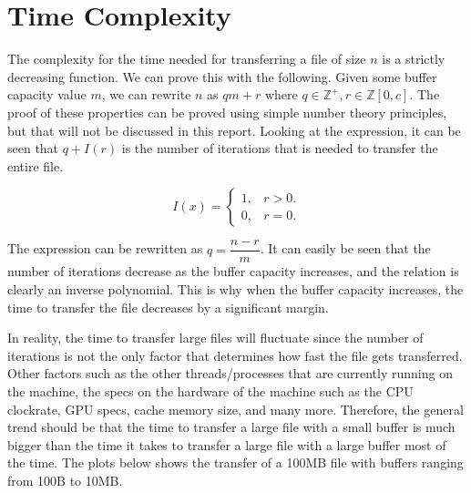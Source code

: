 \documentclass[12pt]{article}
\begin{document}
\section{Time Complexity}

\hspace{10mm}The complexity for the time needed for transferring a file of size $n$ is a strictly decreasing function. We can prove this with the following. Given some buffer capacity value $m$, we can rewrite $n$ as $qm+r$ where $q\in\mathbb{Z}^{+},r\in\mathbb{Z}[0,c]$. The proof of these properties can be proved using simple number theory principles, but that will not be discussed in this report. Looking at the expression, it can be seen that $q+I(r)$ is the number of iterations that is needed to transfer the entire file.

\begin{center}
\begin{equation}
I(x)=\begin{cases}
	1, & \text{$r>0$}.\\
	0, & \text{$r=0$}.
	\end{cases}
\end{equation}
\end{center}

\noindent
The expression can be rewritten as $q=\dfrac{n-r}{m}$. It can easily be seen that the number of iterations decrease as the buffer capacity increases, and the relation is clearly an inverse polynomial. This is why when the buffer capacity increases, the time to transfer the file decreases by a significant margin. 

In reality, the time to transfer large files will fluctuate since the number of iterations is not the only factor that determines how fast the file gets transferred. Other factors such as the other threads/processes that are currently running on the machine, the specs on the hardware of the machine such as the CPU clockrate, GPU specs, cache memory size, and many more. Therefore, the general trend should be that the time to transfer a large file with a small buffer is much bigger than the time it takes to transfer a large file with a large buffer most of the time. The plots below shows the transfer of a 100MB file with buffers ranging from 100B to 10MB. 
\end{document}
